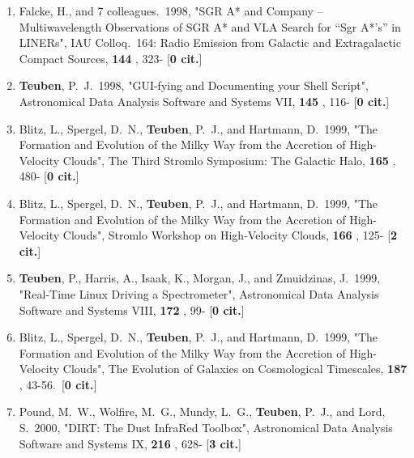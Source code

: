 \documentclass[11pt,letterpaper]{article}
\begin{document}
\begin{enumerate}[resume,label=\textbf{\arabic*}.]
\item  
Falcke, H., and 7 colleagues.\  1998,  "SGR A* and Company -- 
Multiwavelength Observations of SGR A* and VLA Search for ``Sgr A*'s'' in 
LINERs", IAU Colloq.~164: Radio Emission from Galactic and Extragalactic 
Compact Sources,  {\bf 144} , 323- [{\bf 0 cit.}] 

\item  
{\bf Teuben}, P.~J.\  1998,  "GUI-fying and Documenting your Shell Script", 
Astronomical Data Analysis Software and Systems VII,  {\bf 145} , 116- 
[{\bf 0 cit.}] 





\item  
Blitz, L., Spergel, D.~N., {\bf Teuben}, P.~J., and Hartmann, D.\  1999,  "The 
Formation and Evolution of the Milky Way from the Accretion of 
High-Velocity Clouds", The Third Stromlo Symposium: The Galactic Halo,  
{\bf 165} , 480- [{\bf 0 cit.}] 

\item  
Blitz, L., Spergel, D.~N., {\bf Teuben}, P.~J., and Hartmann, D.\  1999,  "The 
Formation and Evolution of the Milky Way from the Accretion of 
High-Velocity Clouds", Stromlo Workshop on High-Velocity Clouds,  {\bf 166} 
, 125- [{\bf 2 cit.}] 

\item  
{\bf Teuben}, P., Harris, A., Isaak, K., Morgan, J., and Zmuidzinas, J.\  1999,  
"Real-Time Linux Driving a Spectrometer", Astronomical Data Analysis 
Software and Systems VIII,  {\bf 172} , 99- [{\bf 0 cit.}] 

\item  
Blitz, L., Spergel, D.~N., {\bf Teuben}, P.~J., and Hartmann, D.\  1999,  "The 
Formation and Evolution of the Milky Way from the Accretion of 
High-Velocity Clouds", The Evolution of Galaxies on Cosmological 
Timescales,  {\bf 187} , 43-56.\  [{\bf 0 cit.}] 


\item  
Pound, M.~W., Wolfire, M.~G., Mundy, L.~G., {\bf Teuben}, P.~J., and Lord, S.\  
2000,  "DIRT: The Dust InfraRed Toolbox", Astronomical Data Analysis 
Software and Systems IX,  {\bf 216} , 628- [{\bf 3 cit.}] 


\end{enumerate}
\end{document}
